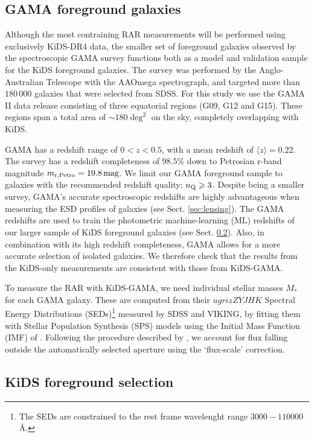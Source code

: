 \documentclass[usenatbib]{mnras}
\newcommand{\magn}{\, {\rm mag} }
\newcommand*{\meanb}[1]{\langle{#1}\rangle}
\newcommand{\un}[1]{_{\rm #1}}
\begin{document}
\subsection{GAMA foreground galaxies}
\label{sec:gama}

Although the most contraining RAR measurements will be performed using exclusively KiDS-DR4 data, the smaller set of foreground galaxies observed by the spectroscopic GAMA survey \cite[]{driver2011} functions both as a model and validation sample for the KiDS foreground galaxies. The survey was performed by the Anglo-Australian Telescope with the AAOmega spectrograph, and targeted more than $180 \, 000$ galaxies that were selected from SDSS. For this study we use the GAMA II data release \cite[]{liske2015} consisting of three equatorial regions (G09, G12 and G15). These regions span a total area of $\sim180 \deg^2$ on the sky, completely overlapping with KiDS.

GAMA has a redshift range of $0<z<0.5$, with a mean redshift of $\meanb{z}=0.22$. The survey has a redshift completeness of $98.5\%$ down to Petrosian r-band magnitude $m\un{r,Petro} = 19.8 \magn$. We limit our GAMA foreground sample to galaxies with the recommended redshift quality: $n\un{Q}\geq3$. Despite being a smaller survey, GAMA's accurate spectroscopic redshifts are highly advantageous when measuring the ESD profiles of galaxies (see Sect. \ref{sec:lensing}). The GAMA redshifts are used to train the photometric machine-learning (ML) redshifts of our larger sample of KiDS foreground galaxies (see Sect. \ref{sec:gamalike_kids}). Also, in combination with its high redshift completeness, GAMA allows for a more accurate selection of isolated galaxies. We therefore check that the results from the KiDS-only measurements are consistent with those from KiDS-GAMA.

To measure the RAR with KiDS-GAMA, we need individual stellar masses $M_*$ for each GAMA galaxy. These are computed from their $ugrizZYJHK$ Spectral Energy Distributions (SEDs)\footnote{The SEDs are constrained to the rest frame wavelenght range $3000-110000$ \AA.} measured by SDSS and VIKING, by fitting them with \cite{bruzual2003} Stellar Population Synthesis (SPS) models using the Initial Mass Function (IMF) of \cite{chabrier2003}. Following the procedure described by \cite{taylor2011}, we account for flux falling outside the automatically selected aperture using the `flux-scale' correction.

\subsection{KiDS foreground selection}
\label{sec:gamalike_kids}
\end{document}
